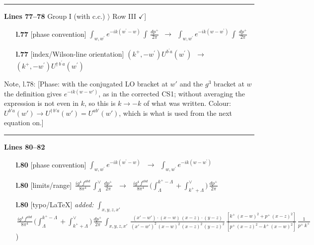 \documentclass[10pt]{article}
\newenvironment{notebox}{\def\FrameCommand{{\color{notebar}\vrule width 1.5pt}\hspace{6pt}}\MakeFramed{\advance\hsize-\width\FrameRestore}\small}{\endMakeFramed}
\begin{document}
\noindent\rule{\linewidth}{0.3pt}\par\noindent\textbf{Lines 77--78} \quad \textsf{Group I (with c.c.) $\rangle$ Row III { $\checkmark$]}} \par
\begin{itemize}[leftmargin=2.2em,itemsep=1pt,topsep=2pt]
\item[\textbf{l.77}] \textsf{\small [phase convention]} $\displaystyle \int_{w, w^\prime} e^{-ik(w^\prime-w)}\, \int\,\frac{dp^{+}}{2\pi}$\ $\longrightarrow$\ $\displaystyle \int_{w, w^\prime} e^{-ik(w-w^\prime)}\, \int\,\frac{dp^{+}}{2\pi}$
\item[\textbf{l.77}] \textsf{\small [index/Wilson-line orientation]} $\displaystyle (k^{+},-w^{\prime})U^{b^{\prime}a}(w^{\prime})$\ $\longrightarrow$\ $\displaystyle (k^{+},-w^{\prime})U^{\dagger\, b^{\prime}a}(w^{\prime})$
\end{itemize}
\begin{notebox}\textsf{\small Note, l.78:} [Phase: with the conjugated LO bracket at $w'$ and the $g^{3}$ bracket at $w$ the definition gives $e^{-ik(w-w')}$, as in the corrected CS1; without averaging the expression is not even in $k$, so this is $k\to-k$ of what was written. Colour: $U^{b'a}(w')\to U^{\dagger\,b'a}(w')=U^{ab'}(w')$, which is what is used from the next equation on.]\end{notebox}
\noindent\rule{\linewidth}{0.3pt}\par\noindent\textbf{Lines 80--82} \par
\begin{itemize}[leftmargin=2.2em,itemsep=1pt,topsep=2pt]
\item[\textbf{l.80}] \textsf{\small [phase convention]} $\displaystyle \int_{w, w^\prime} e^{-ik(w^\prime-w)}\,$\ $\longrightarrow$\ $\displaystyle \int_{w, w^\prime} e^{-ik(w-w^\prime)}\,$
\item[\textbf{l.80}] \textsf{\small [limits/range]} $\displaystyle \, \frac{ig^{4}\,f^{abd}}{8\pi^{4}}\, \int_{\Lambda}^{\vee}\, \frac{dp^{+}}{2\pi}\,$\ $\longrightarrow$\ $\displaystyle \, \frac{ig^{4}\,f^{abd}}{8\pi^{4}}\, \Big(\int_{\Lambda}^{k^{+}-\Lambda}+\int_{k^{+}+\Lambda}^{\vee}\Big)\, \frac{dp^{+}}{2\pi}\,$
\item[\textbf{l.80}] \textsf{\small [typo/LaTeX]} \emph{added:} $\displaystyle \int_{x,y,z,x'}$$\displaystyle \, \frac{ig^{4}\,f^{abd}}{8\pi^{4}}\, \Big(\int_{\Lambda}^{k^{+}-\Lambda}+\int_{k^{+}+\Lambda}^{\vee}\Big)\, \frac{dp^{+}}{2\pi}\, \int_{x,y,z,x'}\,\frac{(x'-w')\cdot (x-w)\, (x-z)\cdot (y-z)}{(x'-w')^{2}\, (x-w)^{2}\, (x-z)^{2}\, (y-z)^{2}}\, \frac{[k^{+}\,(x-w)^{2}+p^{+}\,(x-z)^{2}]}{[p^{+}\,(x-z)^{2}-k^{+}\,(x-w)^{2}]}\, \frac{1}{p^{+}\,k^{+}}${\color{gray}\small)}
\end{itemize}
\end{document}
